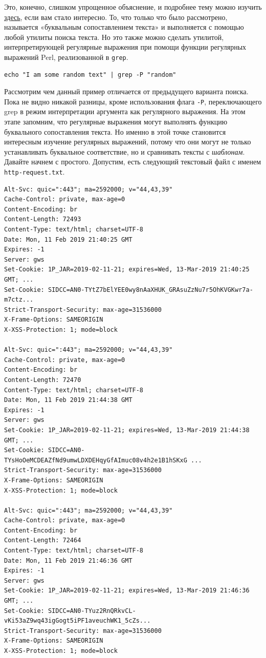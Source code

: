 \documentclass[12pt]{article}
\begin{document}
Это, конечно, слишком упрощенное объяснение, и подробнее тему можно
изучить \href{https://stackoverflow.com/a/1627904/7437737}{здесь}, если
вам стало интересно. То, что только что было рассмотрено, называется
«буквальным сопоставлением текста» и выполняется с помощью
любой утилиты поиска текста. Но это также можно сделать
утилитой, интерпретирующей регулярные выражения при помощи функции
регулярных выражений Perl, реализованной в \texttt{grep}.
\begin{verbatim}
echo "I am some random text" | grep -P "random"
\end{verbatim}

Рассмотрим чем данный пример отличается от предыдущего варианта поиска.
Пока не видно никакой разницы, кроме использования флага \texttt{-P},
переключающего grep в режим интерпретации аргумента как регулярного
выражения. На этом этапе запомним, что регулярные выражения могут
выполнять функцию буквального сопоставления текста. Но именно в этой
точке становится интересным изучение регулярных выражений, потому что
они могут не только устанавливать буквальное соответствие, но и
сравнивать тексты с \emph{шаблонам}. Давайте начнем с простого.
Допустим, есть следующий текстовый файл с именем
\texttt{http-request.txt}.
\begin{verbatim}
Alt-Svc: quic=":443"; ma=2592000; v="44,43,39"
Cache-Control: private, max-age=0
Content-Encoding: br
Content-Length: 72493
Content-Type: text/html; charset=UTF-8
Date: Mon, 11 Feb 2019 21:40:25 GMT
Expires: -1
Server: gws
Set-Cookie: 1P_JAR=2019-02-11-21; expires=Wed, 13-Mar-2019 21:40:25 GMT; ...
Set-Cookie: SIDCC=AN0-TYtZ7bElYEE0wy8nAaXHUK_GRAsuZzNu7r5OhKVGKwr7a-m7ctz...
Strict-Transport-Security: max-age=31536000
X-Frame-Options: SAMEORIGIN
X-XSS-Protection: 1; mode=block

Alt-Svc: quic=":443"; ma=2592000; v="44,43,39"
Cache-Control: private, max-age=0
Content-Encoding: br
Content-Length: 72470
Content-Type: text/html; charset=UTF-8
Date: Mon, 11 Feb 2019 21:44:38 GMT
Expires: -1
Server: gws
Set-Cookie: 1P_JAR=2019-02-11-21; expires=Wed, 13-Mar-2019 21:44:38 GMT; ...
Set-Cookie: SIDCC=AN0-TYsHoOeMCDEAZfNd9umwLDXDEHqyGfAImuc08v4h2e1B1hSKxG ...
Strict-Transport-Security: max-age=31536000
X-Frame-Options: SAMEORIGIN
X-XSS-Protection: 1; mode=block

Alt-Svc: quic=":443"; ma=2592000; v="44,43,39"
Cache-Control: private, max-age=0
Content-Encoding: br
Content-Length: 72464
Content-Type: text/html; charset=UTF-8
Date: Mon, 11 Feb 2019 21:46:36 GMT
Expires: -1
Server: gws
Set-Cookie: 1P_JAR=2019-02-11-21; expires=Wed, 13-Mar-2019 21:46:36 GMT; ...
Set-Cookie: SIDCC=AN0-TYuz2RnQRkvCL-vKi53aZ9wq43igGogt5iPF1aveuchWK1_5cZs...
Strict-Transport-Security: max-age=31536000
X-Frame-Options: SAMEORIGIN
X-XSS-Protection: 1; mode=block
\end{verbatim}
\end{document}
